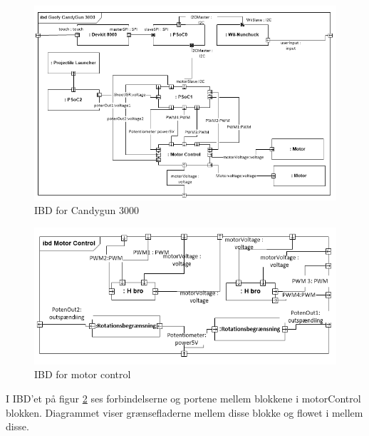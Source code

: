 \begin{figure}[H]
	\centering
	\includegraphics[width=\textwidth]{Systemarkitektur/images/jgjgj}
	\caption{IBD for Candygun 3000}
	\label{fig:IBD}
\end{figure}

\begin{figure}[H]
	\centering
	\includegraphics[width= \textwidth]{Systemarkitektur/images/IBDmotorcontrol2}
	\caption{IBD for motor control}
	\label{fig:IBDm}
\end{figure}
I IBD'et på figur \ref{fig:IBDm} ses forbindelserne og portene mellem blokkene i motorControl blokken. Diagrammet viser grænsefladerne mellem disse blokke og flowet i mellem disse.

